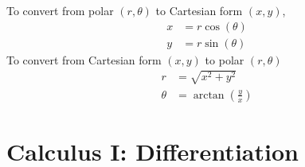 \documentclass[11pt, a4paper]{article}
\begin{document}
\begin{figure}[H]
     \centering
\end{figure}
To convert from polar $(r,\theta)$ to Cartesian form $(x,y)$,
\vspace{-0.2cm}
\begin{align*}
x&=r\cos(\theta) \\
y&=r\sin(\theta)
\end{align*}
To convert from Cartesian form $(x,y)$ to polar $(r,\theta)$
\begin{align*}
r&=\sqrt{x^{2} + y^{2}} \\
\theta&=\arctan\left(\frac{y}{x}\right)
\end{align*}
\vspace{0.5cm}


\clearpage
\section{Calculus I: Differentiation}
\vspace{0.5cm}
\end{document}
